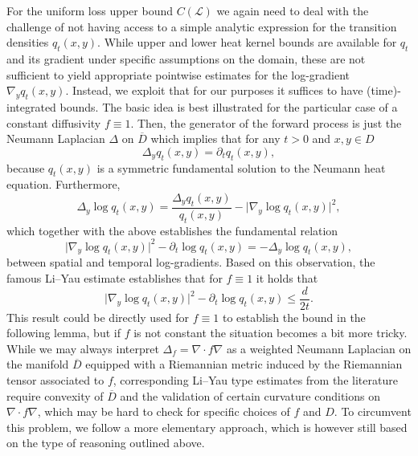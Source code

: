 \documentclass[a4paper, 11pt, headings = small, abstract]{scrartcl}
\begin{document}
For the uniform loss upper bound $C(\mathcal{L})$ we again need to deal with the challenge of not having access to a simple analytic expression for the transition densities $q_t(x,y)$. While upper and lower heat kernel bounds are available for $q_t$ and its gradient under specific assumptions on the domain, these are not sufficient to yield appropriate pointwise estimates for the log-gradient $\nabla_y q_t(x,y)$. Instead, we exploit that for our purposes it suffices to have (time)-integrated bounds. The basic idea is best illustrated for the particular case of a constant diffusivity $f \equiv 1$. Then, the generator of the forward process is just the Neumann Laplacian $\Delta$ on $\overline{D}$ which implies that for any $t > 0$ and $x,y \in D$
\[\Delta_y q_t(x,y) = \partial_t q_t(x,y),\]
because  $q_t(x,y)$ is a symmetric fundamental solution to the Neumann heat equation. Furthermore,  
\[\Delta_y \log q_t(x,y) = \frac{\Delta_y q_t(x,y)}{q_t(x,y)} - \lvert \nabla_y \log q_t(x,y) \rvert^2,\]
which together with the above establishes the fundamental relation 
\[\lvert \nabla_y \log q_t(x,y) \rvert^2 - \partial_t \log q_t(x,y) = - \Delta_y \log q_t(x,y),\]
between spatial and temporal log-gradients. Based on this observation, the famous Li--Yau estimate \cite{liyau} establishes that for $f \equiv 1$ it holds that 
\[\lvert \nabla_y \log q_t(x,y) \rvert^2 - \partial_t \log q_t(x,y) \leq \frac{d}{2t}.\]
This result could be directly used for $f \equiv 1$ to establish the bound in the following lemma, but if $f$ is not constant the situation becomes a bit more tricky. While we may always interpret $\Delta_f = \nabla \cdot f\nabla$ as a weighted Neumann Laplacian on the manifold $\overline{D}$ equipped with a Riemannian metric induced by the Riemannian tensor associated to $f$, corresponding Li--Yau type estimates from the literature \cite{qian95,bakry99} require convexity of $\overline{D}$ and the validation of certain curvature conditions on $\nabla \cdot f \nabla$, which may be hard to check for specific choices of $f$ and $D$. To circumvent this problem, we follow a more elementary approach, which is however still based on the type of reasoning outlined above.
\end{document}
